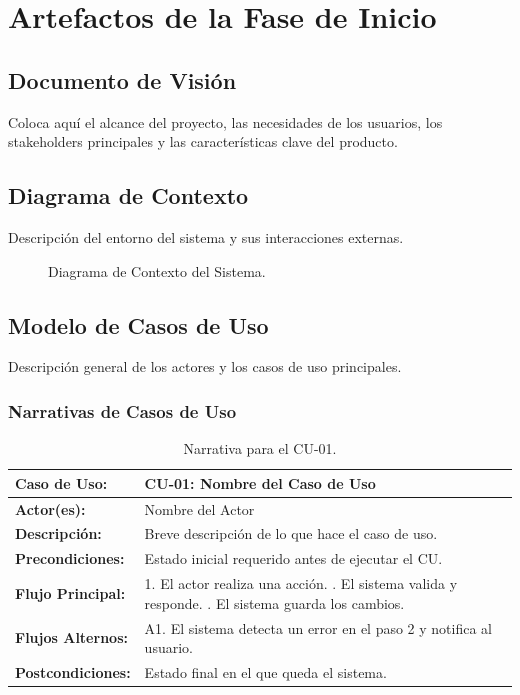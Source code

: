 \documentclass[12pt,letterpaper]{article}
\begin{document}
\section{Artefactos de la Fase de Inicio}

\subsection{Documento de Visión}
Coloca aquí el alcance del proyecto, las necesidades de los usuarios, los stakeholders principales y las características clave del producto.

\subsection{Diagrama de Contexto}
Descripción del entorno del sistema y sus interacciones externas.
\begin{figure}[H]
    \centering
    \caption{Diagrama de Contexto del Sistema.}
    \label{fig:contexto}
\end{figure}

\subsection{Modelo de Casos de Uso}
Descripción general de los actores y los casos de uso principales.

\subsubsection{Narrativas de Casos de Uso}
\begin{table}[H]
\small
\begin{tabularx}{\textwidth}{|l|X|}
\hline
\textbf{Caso de Uso:} & \textbf{CU-01: Nombre del Caso de Uso} \\ \hline
\textbf{Actor(es):} & Nombre del Actor \\ \hline
\textbf{Descripción:} & Breve descripción de lo que hace el caso de uso. \\ \hline
\textbf{Precondiciones:} & Estado inicial requerido antes de ejecutar el CU. \\ \hline
\textbf{Flujo Principal:} & 
1. El actor realiza una acción. \newline
2. El sistema valida y responde. \newline
3. El sistema guarda los cambios. \\ \hline
\textbf{Flujos Alternos:} & A1. El sistema detecta un error en el paso 2 y notifica al usuario. \\ \hline
\textbf{Postcondiciones:} & Estado final en el que queda el sistema. \\ \hline
\end{tabularx}
\caption{Narrativa para el CU-01.}
\end{table}
\end{document}

